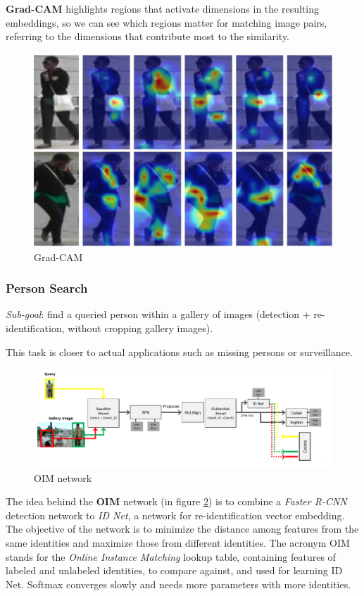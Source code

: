 \textbf{Grad-CAM} highlights regions that activate dimensions in the resulting embeddings, so we can see which regions matter for matching image pairs, referring to the dimensions that contribute most to the similarity.

\begin{figure}[h!]
    \centering
    \includegraphics[width=0.6\linewidth]{images/grad-cam}
    \caption[Grad-CAM]{Grad-CAM}
    \label{fig:grad-cam}
\end{figure}



\subsubsection{Person Search}\label{sec:vs-person-search}

\textit{Sub-goal}: find a queried person within a gallery of images (detection + re-identification, without cropping gallery images).

This task is closer to actual applications such as missing persons or surveillance.

\begin{figure}[h!]
    \centering
    \includegraphics[width=.9\linewidth]{images/oim}
    \caption[OIM network]{OIM network}
    \label{fig:oim}
\end{figure}

The idea behind the \textbf{OIM} network (in figure \ref{fig:oim}) is to combine a \textit{Faster R-CNN} detection network to \textit{ID Net}, a network for re-identification vector embedding.\\
The objective of the network is to minimize the distance among features from the same identities and maximize those from different identities. The acronym OIM stands for the \textit{Online Instance Matching} lookup table, containing features of labeled and unlabeled identities, to compare against, and used for learning ID Net. Softmax converges slowly and needs more parameters with more identities.

